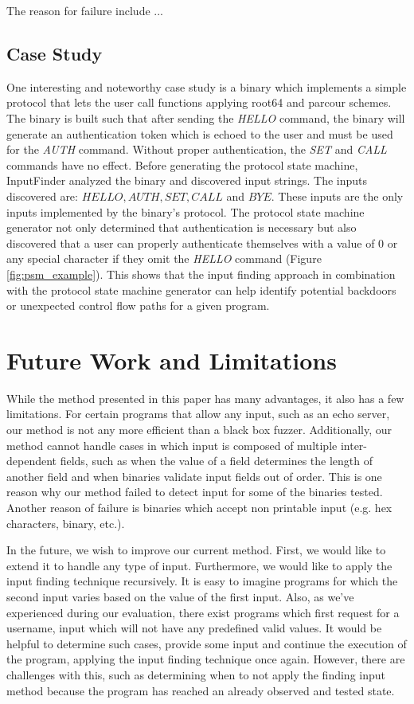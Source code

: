 \documentclass{acm_proc_article-sp}
\def \tool {InputFinder}
\begin{document}
The reason for failure include ...

\subsection{Case Study}
One interesting and noteworthy case study is a binary which implements a simple protocol that lets the user call functions applying root64 and parcour schemes.
The binary is built such that after sending the \textit{HELLO} command, the binary will generate an authentication token which is echoed to the user and must be used for the \textit{AUTH} command.
Without proper authentication, the \textit{SET} and \textit{CALL} commands have no effect.
Before generating the protocol state machine, \tool{} analyzed the binary and discovered input strings.
The inputs discovered are: $HELLO, AUTH, SET, CALL$ and $BYE$.
These inputs are the only inputs implemented by the binary's protocol.
The protocol state machine generator not only determined that authentication is necessary but also discovered that a user can properly authenticate themselves with a value of 0 or any special character if they omit the \textit{HELLO} command (Figure \ref{fig:psm_example}).
This shows that the input finding approach in combination with the protocol state machine generator can help identify potential backdoors or unexpected control flow paths for a given program.

\section{Future Work and Limitations} \label{futurework}
While the method presented in this paper has many advantages, it also has a few limitations.
For certain programs that allow any input, such as an echo server, our method is not any more efficient than a black box fuzzer.
Additionally, our method cannot handle cases in which input is composed of multiple inter-dependent fields, such as when the value of a field determines the length of another field and when binaries validate input fields out of order.
This is one reason why our method failed to detect input for some of the binaries tested.
Another reason of failure is binaries which accept non printable input (e.g. hex characters, binary, etc.).

In the future, we wish to improve our current method.
First, we would like to extend it to handle any type of input.
Furthermore, we would like to apply the input finding technique recursively.
It is easy to imagine programs for which the second input varies based on the value of the first input.
Also, as we've experienced during our evaluation, there exist programs which first request for a username, input which will not have any predefined valid values.
It would be helpful to determine such cases, provide some input and continue the execution of the program, applying the input finding technique once again.
However, there are challenges with this, such as determining when to not apply the finding input method because the program has reached an already observed and tested state.
\end{document}

